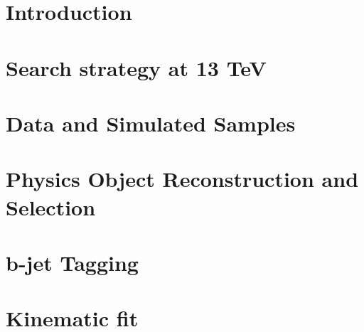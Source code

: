\documentclass[11pt,twoside,a4paper,an]{cms-tdr}
\begin{document}
\newpage

\newpage

\newpage
\section{Introduction}
\label{s:secIntro}


\newpage
\section{Search strategy at 13 TeV}
\label{s:searchStrategy}


\newpage
\section{Data and Simulated Samples}
\label{s:secDataMC}


\newpage
\section{Physics Object Reconstruction and Selection}
\label{s:secReco}


\section{b-jet Tagging}
\label{s:bTag}


\section{Kinematic fit}
\label{s:KinFit}


\end{document}
